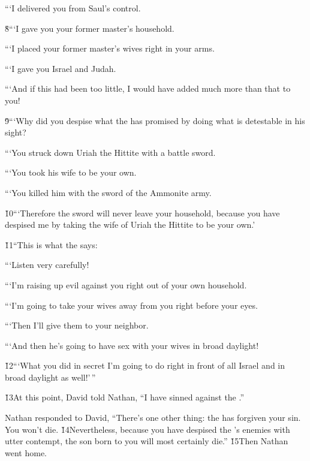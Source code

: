 ```I delivered you from Saul's control.

\v{8}```I gave you your former master's household.

```I placed your former master's wives right in your arms.

```I gave you Israel and Judah.

```And if this had been too little, I would have added much more than that to you!

\v{9}```Why did you despise what the  has promised by doing what is detestable in his sight?

```You struck down Uriah the Hittite with a battle sword.

```You took his wife to be your own.

```You killed him with the sword of the Ammonite army.

\v{10}```Therefore the sword will never leave your household, because you have despised me by taking the wife of Uriah the Hittite to be your own.'

\v{11}``This is what the  says:

```Listen very carefully!

```I'm raising up evil against you right out of your own household.

```I'm going to take your wives away from you right before your eyes.

```Then I'll give them to your neighbor.

```And then he's going to have sex with your wives in broad daylight!

\v{12}```What you did in secret I'm going to do right in front of all Israel and in broad daylight as well!'\,''

\v{13}At this point, David told Nathan, ``I have sinned against the .''

Nathan responded to David, ``There's one other thing: the  has forgiven your sin. You won't die. \v{14}Nevertheless, because you have despised the 's enemies with utter contempt, the son born to you will most certainly die.'' \v{15}Then Nathan went home.

